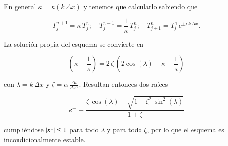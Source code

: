 \documentclass[a4paper,3.3mm]{article}
\newcommand{\parn}[1]{\left(#1\right)}
\begin{document}
En general \( \kappa = \kappa \parn{ k\,\Delta x } \) y tenemos que calcularlo sabiendo que

\[
    T_{j}^{n+1} = \kappa\,T_{j}^{n}; \quad T_{j}^{n-1} = \frac{1}{\kappa}\,T_{j}^{n}; \quad T_{j \pm 1}^{n} = T_{j}^{n}\,e^{\pm i\,k\,\Delta x}.
\]

La solución propia del esquema se convierte en

\[
    \parn{ \kappa - \frac{1}{\kappa} } = 2\,\zeta\,\parn{ 2 \cos(\lambda) - \kappa - \frac{1}{\kappa} }
\]

con \( \lambda = k\,\Delta x \) y \( \zeta = \alpha\,\frac{\Delta t}{\Delta x^{2}} \). Resultan entonces dos raíces

\[
    \kappa^{\pm} = \frac{ \zeta\,\cos(\lambda) \pm \sqrt{ 1 - \zeta^{2}\,\sin^{2}(\lambda) } }{ 1 + \zeta }
\]

cumpliéndose \( \abs{\kappa^{\pm}} \leq 1 \) para todo \(\lambda\) y para todo \(\zeta\), por lo que el esquema es
incondicionalmente estable.
\end{document}
